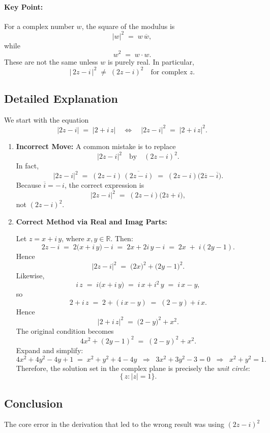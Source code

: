 \documentclass[12pt]{article}
\begin{document}
\paragraph{Key Point:} For a complex number $w$, the square of the modulus is 
\[
  |w|^2 \;=\; w\,\overline{w},
\]
while
\[
  w^2 \;=\; w \cdot w.
\]
These are not the same unless $w$ is purely real. In particular,
\[
  |\,2z - i\,|^2 
  \;\neq\; (2z - i)^2
  \quad\text{for complex }z.
\]

\subsection*{Detailed Explanation}

We start with the equation
\[
\bigl\lvert 2z - i \bigr\rvert 
\;=\; 
\bigl\lvert 2 + i\,z \bigr\rvert
\quad\Longleftrightarrow\quad
\bigl\lvert 2z - i \bigr\rvert^2 
\;=\; 
\bigl\lvert 2 + i\,z \bigr\rvert^2.
\]

\begin{enumerate}
\item \textbf{Incorrect Move:}  
  A common mistake is to replace
  \[
    \bigl\lvert 2z - i\bigr\rvert^2
    \quad\text{by}\quad
    (2z - i)^2.
  \]
  In fact,
  \[
    \bigl\lvert 2z - i\bigr\rvert^2
    \;=\;(2z - i)\,\overline{(2z - i)}
    \;=\;(2z - i)\bigl(2\overline{z} - \overline{i}\bigr).
  \]
  Because $\overline{i} = -\,i$, the correct expression is
  \[
    \bigl\lvert 2z - i\bigr\rvert^2 
    \;=\;
    (2z - i)\bigl(2\overline{z} + i\bigr),
  \]
  not $(2z - i)^2$.

\item \textbf{Correct Method via Real and Imag Parts:}

  Let $z = x + i\,y$, where $x,y\in\mathbb{R}$. Then:
  \[
    2z - i 
    \;=\; 2\bigl(x + i\,y\bigr) - i
    \;=\; 2x + 2i\,y - i
    \;=\; 2x \;+\; i(2y - 1).
  \]
  Hence
  \[
    \bigl\lvert 2z - i \bigr\rvert^2
    \;=\; \bigl(2x\bigr)^2 + \bigl(2y - 1\bigr)^2.
  \]
  Likewise,
  \[
    i\,z 
    \;=\; i\bigl(x + i\,y\bigr) 
    \;=\; i\,x + i^2\,y 
    \;=\; i\,x - y,
  \]
  so
  \[
    2 + i\,z 
    \;=\; 2 + (i\,x - y)
    \;=\; (2 - y) + i\,x.
  \]
  Hence
  \[
    \bigl\lvert 2 + i\,z \bigr\rvert^2
    \;=\;\bigl(2 - y\bigr)^2 + x^2.
  \]
  The original condition becomes
  \[
    4x^2 + (2y - 1)^2 
    \;=\; (2 - y)^2 + x^2.
  \]
  Expand and simplify:
  \[
    4x^2 + 4y^2 - 4y + 1 
    \;=\; x^2 + y^2 + 4 - 4y
    \;\;\Longrightarrow\;\;
    3x^2 + 3y^2 - 3 = 0
    \;\;\Longrightarrow\;\;
    x^2 + y^2 = 1.
  \]
  Therefore, the solution set in the complex plane is precisely the \emph{unit circle}:
  \[
    \bigl\{\,z : |z| = 1 \bigr\}.
  \]

\end{enumerate}

\subsection*{Conclusion}

The core error in the derivation that led to the wrong result was using $(2z - i)^2$
\end{document}
